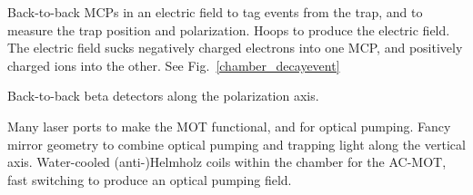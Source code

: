 Back-to-back MCPs in an electric field to tag events from the trap, and to measure the trap position and polarization.  Hoops to produce the electric field.  The electric field sucks negatively charged electrons into one MCP, and positively charged ions into the other.  See Fig.~\ref{chamber_decayevent}

Back-to-back beta detectors along the polarization axis.  

	Many laser ports to make the MOT functional, and for optical pumping.  Fancy mirror geometry to combine optical pumping and trapping light along the vertical axis.  Water-cooled (anti-)Helmholz coils within the chamber for the AC-MOT, fast switching to produce an optical pumping field.  

